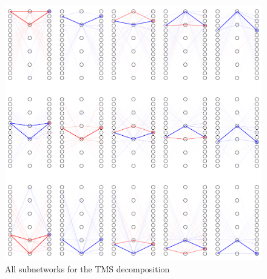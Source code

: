 \documentclass{article}
\theoremstyle{plain}
\theoremstyle{definition}
\theoremstyle{remark}
\begin{document}
\begin{figure}[ht]
    \centerline{\includegraphics[width=\textwidth]{../figures/s3_tms_full_subnetworks.pdf}}
    \centering
    \caption{All subnetworks for the TMS decomposition}\label{fig:s3_tms_full_subnetworks}
\end{figure}
\end{document}
